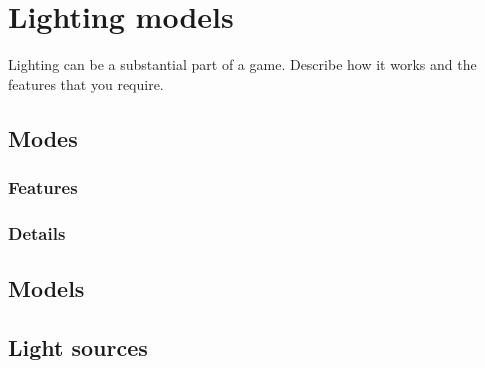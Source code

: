 \section{Lighting models} %
Lighting can be a substantial part of a game. Describe how it works and the features that you require.
\subsection{Modes} %
\subsubsection{Features} %

\subsubsection{Details} %

\subsection{Models} %
\subsection{Light sources} %